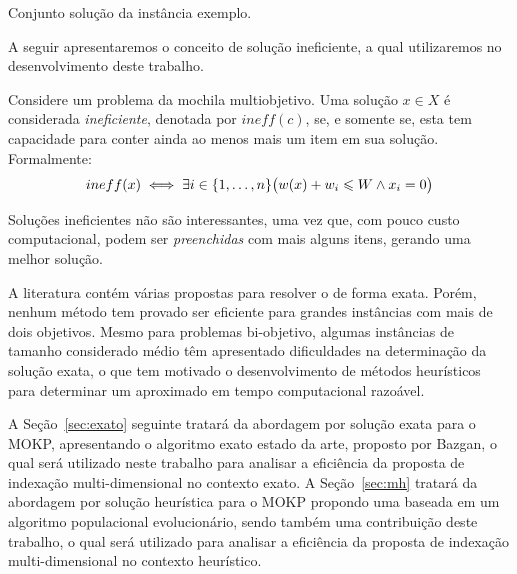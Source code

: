 \begin{table}[ht]
  
  \caption{Conjunto solução da instância exemplo.}
  \label{tab:exsol}
\end{table}

A seguir apresentaremos o conceito de solução ineficiente, a qual
utilizaremos no desenvolvimento deste trabalho.

\begin{mydef}
Considere um problema da mochila multiobjetivo. Uma solução $x \in X$ é considerada
\emph{ineficiente}, denotada por $ineff(c)$, se, e somente se, esta tem capacidade para conter ainda ao menos mais um item em sua solução. Formalmente:
\begin{displaymath}
  ineff(x) \iff \exists i \in \{1, \ldots, n\} \big(w(x) + w_i \leqslant W \land x_i = 0\big)
\end{displaymath}
\end{mydef}
Soluções ineficientes não são interessantes, uma vez que,
com pouco custo computacional, podem ser \emph{preenchidas} com mais alguns itens,
gerando uma melhor solução.

A literatura contém várias propostas para resolver o \mokp{} de forma exata.
Porém, nenhum método tem provado ser eficiente para grandes instâncias
com mais de dois objetivos.
Mesmo para problemas bi-objetivo, algumas instâncias de tamanho considerado
médio têm apresentado dificuldades na determinação da solução exata, o que
tem motivado o desenvolvimento de métodos heurísticos para determinar
um \paretoset{} aproximado em tempo computacional razoável.

A Seção~\ref{sec:exato} seguinte tratará da abordagem por solução exata para o MOKP,
apresentando o algoritmo exato estado da arte, proposto por Bazgan,
o qual será utilizado neste trabalho para analisar a eficiência da
proposta de indexação multi-dimensional no contexto exato.
A Seção~\ref{sec:mh} tratará da abordagem por solução heurística para o MOKP
propondo uma baseada em um algoritmo populacional
evolucionário, sendo também uma contribuição deste trabalho, o qual será utilizado
para analisar a eficiência da proposta de indexação multi-dimensional
no contexto heurístico.

